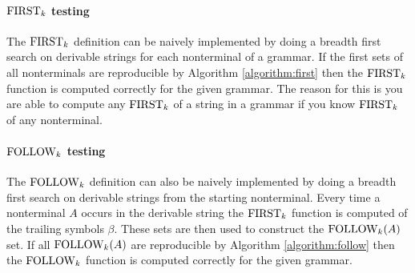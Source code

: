 \paragraph{\texorpdfstring{$\text{FIRST}_k$}{TEXT} testing}
The $\text{FIRST}_k$ definition can be naively implemented by doing a breadth first search on derivable strings for each nonterminal of a grammar. If the first sets of all nonterminals are reproducible by Algorithm \ref{algorithm:first} then the $\text{FIRST}_k$ function is computed correctly for the given grammar. The reason for this is you are able to compute any $\text{FIRST}_k$ of a string in a grammar if you know $\text{FIRST}_k$ of any nonterminal.

\paragraph{\texorpdfstring{$\text{FOLLOW}_k$}{TEXT} testing}
The $\text{FOLLOW}_k$ definition can also be naively implemented by doing a bread\-th first search on derivable strings from the starting nonterminal. Every time a nonterminal $A$ occurs in the derivable string the $\text{FIRST}_k$ function is computed of the trailing symbols $\beta$. These sets are then used to construct the $\text{FOLLOW}_k(A)$ set. If all $\text{FOLLOW}_k(A)$ are reproducible by Algorithm \ref{algorithm:follow} then the $\text{FOLLOW}_k$ function is computed correctly for the given grammar.

